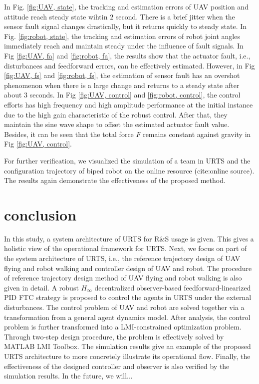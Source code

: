 \documentclass{ieeeaccess}
\begin{document}
In Fig. \ref{fig:UAV, state}, the tracking and estimation errors of UAV position and attitude reach steady state wihtin $2$ second. There is a brief jitter when the sensor fault signal changes drastically, but it returns quickly to steady state. In Fig. \ref{fig:robot, state}, the tracking and estimation errors of robot joint angles immediately reach and maintain steady under the influence of fault signals. In Fig \ref{fig:UAV, fa} and \ref{fig:robot, fa}, the results show that the actuator fault, i.e., disturbances and feedforward errors, can be effectively estimated. However, in Fig \ref{fig:UAV, fs} and \ref{fig:robot, fs}, the estimation of sensor fault has an overshot phenomenon when there is a large change and returns to a steady state after about $3$ seconds. In Fig \ref{fig:UAV, control} and \ref{fig:robot, control}, the control efforts has high frequency and high amplitude performance at the initial instance due to the high gain characteristic of the robust control. After that, they maintain the sine wave shape to offset the estimated actuator fault value. Besides, it can be seen that the total force $F$ remains constant against gravity in Fig \ref{fig:UAV, control}.

For further verification, we visualized the simulation of a team in URTS and the configuration trajectory of biped robot on the online resource (cite:online source). The results again demonstrate the effectiveness of the proposed method.

\section{conclusion}
In this study, a system architecture of URTS for R\&S usage is given. This gives a holistic view of the operational framework for URTS. Next, we focus on part of the system architecture of URTS, i.e., the reference trajectory design of UAV flying and robot walking and controller design of UAV and robot. The procedure of reference trajectory design method of UAV flying and robot walking is also given in detail. A robust $H_\infty$ decentralized observer-based feedforward-linearized PID FTC strategy is proposed to control the agents in URTS under the external disturbances. The control problem of UAV and robot are solved together via a transformation from a general agent dynamics model. After analysis, the control problem is further transformed into a LMI-constrained optimization problem. Through two-step design procedure, the problem is effectively solved by MATLAB LMI Toolbox. The simulation results give an example of the proposed URTS architecture to more concretely illustrate its operational flow. Finally, the effectiveness of the designed controller and observer is also verified by the simulation results. In the future, we will...





\EOD
\end{document}
